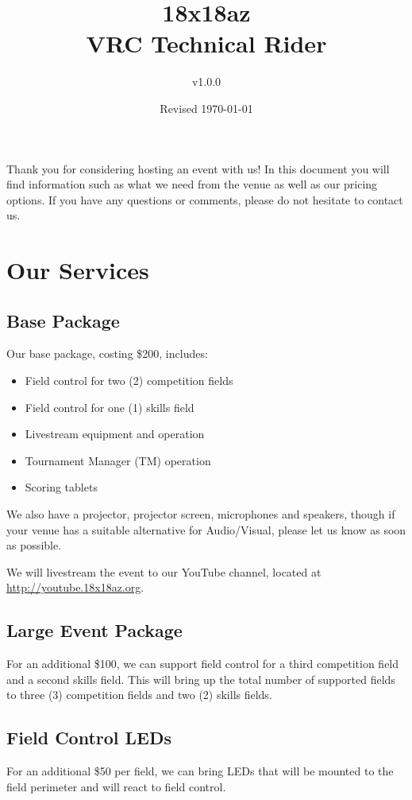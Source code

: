 \documentclass[12pt]{article}
\title{18x18az\\VRC Technical Rider}
\author{v1.0.0}
\date{Revised \today}
\begin{document}
\maketitle
Thank you for considering hosting an event with us!
In this document you will find information such as what we need from the venue as well as our pricing options.
If you have any questions or comments, please do not hesitate to contact us.
\tableofcontents
\pagebreak
\section{Our Services}
\subsection{Base Package}
Our base package, costing \$200, includes:
\begin{itemize}
    \item Field control for two (2) competition fields
    \item Field control for one (1) skills field
    \item Livestream equipment and operation
    \item Tournament Manager (TM) operation
    \item Scoring tablets
\end{itemize}
We also have a projector, projector screen, microphones and speakers, though if your venue has a suitable alternative for Audio/Visual, please let us know as soon as possible.
\vspace{1em}

\noindent We will livestream the event to our YouTube channel, located at \\\url{http://youtube.18x18az.org}.

\subsection{Large Event Package}
For an additional \$100, we can support field control for a third competition field and a second skills field.
This will bring up the total number of supported fields to three (3) competition fields and two (2) skills fields.

\subsection{Field Control LEDs}
For an additional \$50 per field, we can bring LEDs that will be mounted to the field perimeter and will react to field control.
\end{document}
